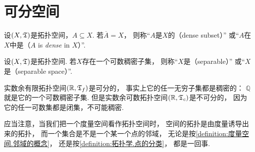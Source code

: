 \section{可分空间}
\begin{definition}
设\((X,\mathfrak T)\)是拓扑空间，\(A \subseteq X\).
若\(\overline{A}=X\)，
则称“\(A\)是\(X\)的（dense subset）”
或“\(A\)在\(X\)中是（\(A\) is \emph{dense} in \(X\)）”.
\end{definition}

\begin{definition}
设\((X,\mathfrak T)\)是拓扑空间.
若\(X\)存在一个可数稠密子集，
则称“\(X\)是（separable）”
或“\(X\)是（separable space）”.
\end{definition}

\begin{example}
实数余有限拓扑空间\((\mathbb{R},\mathfrak T_f)\)是可分的，
事实上它的任一无穷子集都是稠密的：
\(\mathbb{Q}\)就是它的一个可数稠密子集.
但是实数余可数拓扑空间\((\mathbb{R},\mathfrak T_c)\)是不可分的，
因为它的任一可数集都是闭集，不可能稠密.
\end{example}

\begin{remark}
应当注意，当我们把一个度量空间看作拓扑空间时，
空间的拓扑是由度量诱导出来的拓扑，
而一个集合是不是一个某一个点的邻域，
无论是按\cref{definition:度量空间.邻域的概念}，
还是按\cref{definition:拓扑学.点的分类}，
都是一回事.
\end{remark}
